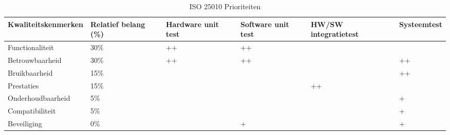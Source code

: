 \documentclass[a4paper]{report}
\newcommand{\turtleguard}{\mbox{TurtleGuard\texttrademark}\xspace}
\begin{document}
\begin{table}[H]
  \centering
  \begin{tabularx}{\textwidth}{|l|X|X|X|X|X|}
    \hline
    \textbf{Kwaliteitskenmerken} & \textbf{Relatief \newline belang \newline (\%)} & \textbf{Hardware \newline unit test} & \textbf{Software \newline unit test} & \textbf{HW/SW \newline integratietest} & \textbf{Systeemtest} \\
    \hline 
    Functionaliteit & 30\% & ++ & ++ &  &  \\ 
    \hline
    Betrouwbaarheid & 30\% & ++ & ++ &  & ++ \\ 
    \hline
    Bruikbaarheid & 15\% &  &  &  & ++ \\ 
    \hline
    Prestaties & 15\% &  &  & ++ &  \\ 
    \hline
    Onderhoudbaarheid & 5\% &  &  &  & + \\ 
    \hline
    Compatibiliteit & 5\% &  &  &  & + \\ 
    \hline
    Beveiliging & 0\% &  & + &  & + \\ 
    \hline
  \end{tabularx}
  \caption{ISO 25010 Prioriteiten}
  \label{tab:25010_priorities}
\end{table}


\end{document}
